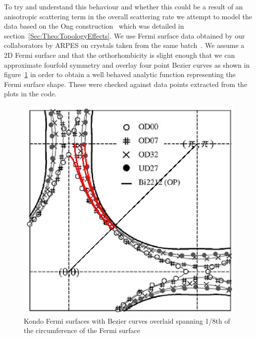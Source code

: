 To try and understand this behaviour and whether this could be a result of an anisotropic scattering term in the overall scattering rate we attempt to model the data based on the Ong construction~\cite{Ong1991} which was detailed in section~\ref{Sec:Theo:TopologyEffects}. We use Fermi surface data obtained by our collaborators by \ac{ARPES} on crystals taken from the same batch~\cite{Kondo2004}. We assume a 2D Fermi surface and that the orthorhombicity is slight enough that we can approximate fourfold symmetry and overlay four point Bezier curves as shown in figure~\ref{Fig:ResH:KondoFS} in order to obtain a well behaved analytic function representing the Fermi surface shape. These were checked against data points extracted from the plots in the code.
\begin{figure}[htbp]
    \begin{center}
        \includegraphics[scale=0.9]{Chapter-HallBSCO/Figures/KondoFS/KondoFS}
        \caption{Kondo Fermi surfaces with Bezier curves overlaid spanning 1/8th of the circumference of the Fermi surface}
        \label{Fig:ResH:KondoFS}
    \end{center}
\end{figure}

